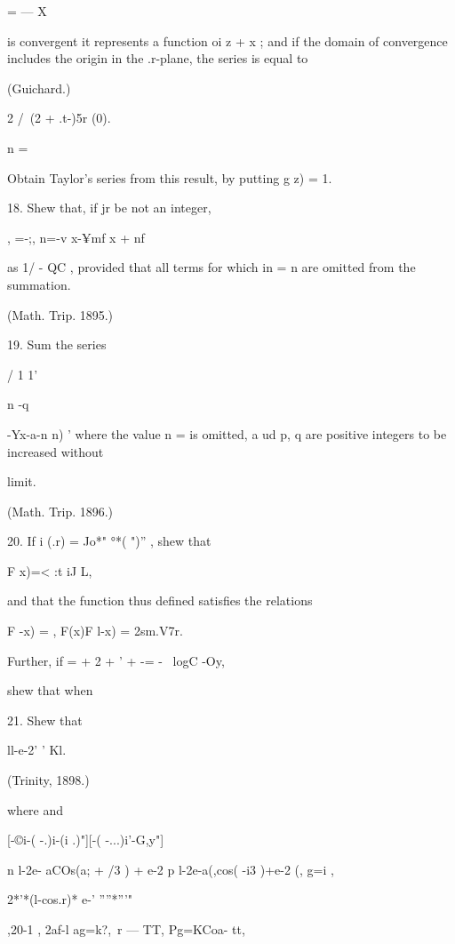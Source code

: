{{  = — X 

is convergent it represents a function oi z + x ; and if the domain of convergence includes 
the origin in the .r-plane, the series is equal to 



(Guichard.) 



2 /\  (2 + .t-)5r (0). 

n = 

Obtain Taylor's series from this result, by putting g z) = 1. 

18. Shew that, if jr be not an integer, 

, =-;, n=-v x-¥mf x + nf 

as 1/ -  QC , provided that all terms for which in = n are omitted from the summation. 

(Math. Trip. 1895.) 

19. Sum the series 

  / 1 1' 



n -q \ \ {-Yx-a-n n) ' 
where the value n = is omitted, a ud p, q are positive integers to be increased without 

limit. 

(Math. Trip. 1896.) 

20. If i (.r) = Jo*" °*( ")'' , shew that 

F x)=< :t iJ  L, 

and that the function thus defined satisfies the relations 

F -x) =  , F(x)F l-x) = 2sm.V7r. 

Further, if     =  +  2 +   ' + -= - \ logC -Oy, 



shew that 
when 

21. Shew that 



ll-e-2' ' Kl. 



(Trinity, 1898.) 



where 
and 



[-©i-( -.)i-(i .)"][-( -...)i'-G,y"] 

n  l-2e- aCOs(a; + /3 ) + e-2  p   l-2e-a(,cos( -i3 )+e-2 (,   
  g=i , 

2*'*(l-cos.r)* e-' ''''*'''" 

,20-1   , 2af-l 
ag=k?,\ r   — TT, Pg=KCoa-  tt, 

}}}
